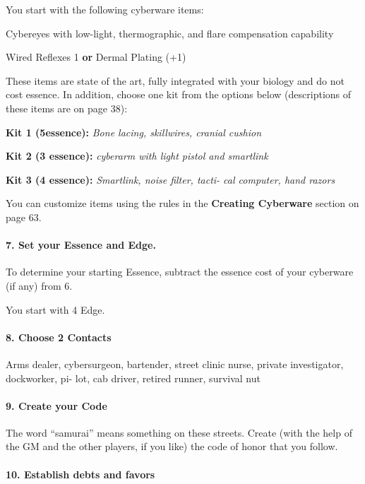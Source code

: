 \begin{multicols}{3}
You start with the following cyberware items:


\begin{adjustwidth*}{.5cm}{.5cm}
\tcirc{} Cybereyes with low-light, thermographic,
and flare compensation capability

\tcirc{} Wired Reflexes 1 \textbf{or} Dermal Plating (+1)
\end{adjustwidth*}

These items are state of the art, fully integrated
with your biology and do not cost essence. In
addition, choose one kit from the options below
(descriptions of these items are on page 38):


\textbf{Kit 1 (5essence):} \textit{Bone lacing, skillwires,
cranial cushion}

\textbf{Kit 2 (3 essence):} \textit{cyberarm with light pistol
and smartlink}

\textbf{Kit 3 (4 essence):} \textit{Smartlink, noise filter, tacti-
cal computer, hand razors}

You can customize items using the rules in the
\textbf{Creating Cyberware} section on page 63.

\paragraph{7.  Set your Essence and Edge.}

To determine your starting Essence, subtract the
essence cost of your cyberware (if any) from 6.

You start with 4 Edge.

\paragraph{8.  Choose 2 Contacts}

Arms dealer, cybersurgeon, bartender, street
clinic nurse, private investigator, dockworker, pi-
lot, cab driver, retired runner, survival nut

\paragraph{9.  Create your Code}

The word “samurai” means something on these
streets. Create (with the help of the GM and the
other players, if you like) the code of honor that
you follow.


\paragraph{10.  Establish debts and favors}


\end{multicols}
